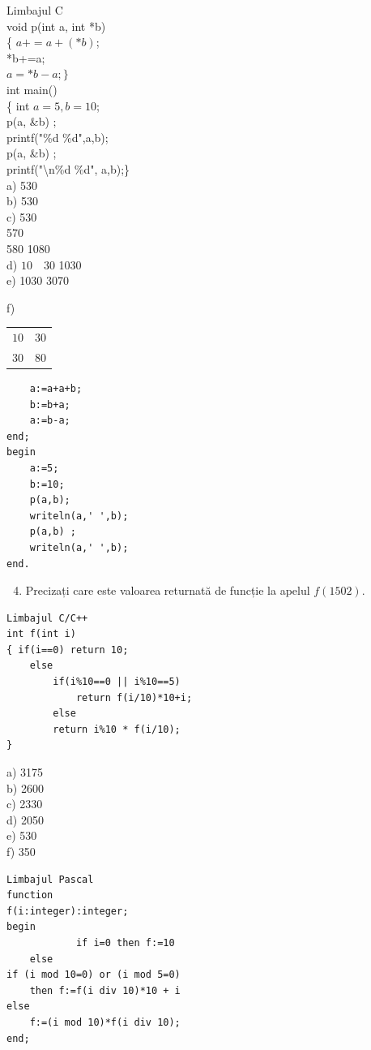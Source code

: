 \documentclass[10pt]{article}
\begin{document}
Limbajul C\\
void p(int a, int *b)\\
\{ $a+=a+(* b)$;\\
*b+=a;\\
$a=* b-a ;\}$\\
int main()\\
\{ int $a=5, b=10$;\\
p(a, \&b) ;\\
printf("\%d \%d",a,b);\\
p(a, \&b) ;\\
printf("\textbackslash n\%d \%d", a,b);\}\\
a) 530\\
b) 530\\
c) 530\\
570\\
580 1080\\
d) $10 \quad 30$ 1030\\
e) 1030 3070

f) \begin{tabular}{l}
$10 \quad 30$ \\
$30 \quad 80$ \\
\end{tabular}

\begin{verbatim}
    a:=a+a+b;
    b:=b+a;
    a:=b-a;
end;
begin
    a:=5;
    b:=10;
    p(a,b);
    writeln(a,' ',b);
    p(a,b) ;
    writeln(a,' ',b);
end.
\end{verbatim}

\begin{enumerate}
  \setcounter{enumi}{3}
  \item Precizați care este valoarea returnată de funcție la apelul $f(1502)$.
\end{enumerate}

\begin{verbatim}
Limbajul C/C++
int f(int i)
{ if(i==0) return 10;
    else
        if(i%10==0 || i%10==5)
            return f(i/10)*10+i;
        else
        return i%10 * f(i/10);
}
\end{verbatim}

a) 3175\\
b) 2600\\
c) 2330\\
d) 2050\\
e) 530\\
f) 350

\begin{verbatim}
Limbajul Pascal
function
f(i:integer):integer;
begin
            if i=0 then f:=10
    else
if (i mod 10=0) or (i mod 5=0)
    then f:=f(i div 10)*10 + i
else
    f:=(i mod 10)*f(i div 10);
end;
\end{verbatim}
\end{document}
